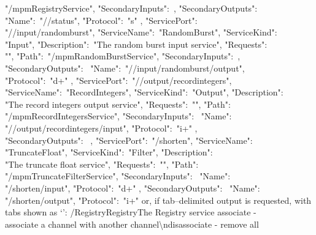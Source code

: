 "\textellipsis/mpmRegistryService", "SecondaryInputs":\ \sqPair, "SecondaryOutputs":\
\openSq{} \textbraceleft\\
"Name":\ "/\dollarService/status", "Protocol":\ "s" \textbraceright{} \closeSq{}
\textbraceright, \textbraceleft{} "ServicePort":\ \\
"/\serviceName/input/randomburst", "ServiceName":\ "RandomBurst", "ServiceKind":\ \\
"Input", "Description":\ "The random burst input service", "Requests":\ \\
"", "Path":\ "\textellipsis/mpmRandomBurstService", "SecondaryInputs":\ \sqPair,\\
"SecondaryOutputs":\ \openSq{} \textbraceleft{} "Name":\ 
"/\serviceName/input/randomburst/output",\\
"Protocol":\ "d+" \textbraceright{} \closeSq{} \textbraceright, \textbraceleft{}
"ServicePort":\ "/\serviceName/output/recordintegers",\\
"ServiceName":\ "RecordIntegers", "ServiceKind":\ "Output", "Description":\ \\
"The record integers output service", "Requests":\ "", "Path":\ \\
"\textellipsis/mpmRecordIntegersService", "SecondaryInputs":\ \openSq{} \textbraceleft{}
"Name":\ \\
"/\serviceName/output/recordintegers/input", "Protocol":\ "i+" \textbraceright{} %
\closeSq,\\
"SecondaryOutputs":\ \sqPair{} \textbraceright, \textbraceleft{} "ServicePort":\ 
"/shorten", "ServiceName":\ \\
"TruncateFloat", "ServiceKind":\ "Filter", "Description":\ \\
"The truncate float service", "Requests":\ "", "Path":\ \\
"\textellipsis/mpmTruncateFilterService", "SecondaryInputs":\ \openSq{} \textbraceleft{}
"Name":\ \\
"/shorten/input", "Protocol":\ "d+" \textbraceright{} \closeSq, "SecondaryOutputs":\ 
\openSq{} \textbraceleft{} "Name":\ \\
"/shorten/output", "Protocol":\ "i+" \textbraceright{} \closeSq{} \textbraceright{}
\closeSq
\outputEnd{}
or, if tab--delimited output is requested, with tabs shown as
`\texttt{\boldmath{$\vdash$}}':
\outputBegin{}
/\dollarService\pseudotab{}Registry\pseudotab{}Registry\pseudotab{}The Registry service%
\pseudotab{}associate - \\
associate a channel with another channel\textbackslash{}ndisassociate - remove all\\
